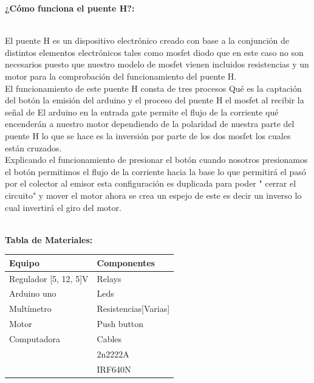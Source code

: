 \documentclass[letterpaper]{article}
\begin{document}
\begin{huge}
\textbf{¿Cómo funciona el puente H?:}\\\\
\end{huge}
El puente H es un dispositivo electrónico creado con base a la conjunción de distintos elementos electrónicos tales como mosfet diodo que en este caso no son necesarios puesto que nuestro modelo de mosfet vienen incluidos resistencias y un motor para la comprobación del funcionamiento del puente H.\\
El funcionamiento de este puente H consta de tres procesos Qué es la captación del botón la emisión del arduino y el proceso del puente H el mosfet al recibir la señal de El arduino en la entrada gate permite el flujo de la corriente qué encenderán a nuestro motor dependiendo de la polaridad de nuestra parte del puente H lo que se hace es la inversión por parte de los dos mosfet los cuales están cruzados.\\
Explicando el funcionamiento de presionar el botón cuando nosotros presionamos el botón permitimos el flujo de la corriente hacia la base lo que permitirá el pasó por el colector al emisor esta configuración es duplicada para poder " cerrar el circuito" y mover el motor ahora se crea un espejo de este es decir un inverso lo cual invertirá el giro del motor.
\\\\
\begin{huge}
\textbf{Tabla de Materiales:}\\
\end{huge}


    \begin{table}[h]
\begin{tabular}{|l|l|}
\hline
{\color[HTML]{3166FF} \textbf{Equipo}} & {\color[HTML]{CB0000} \textbf{Componentes}} \\ \hline
Regulador {[}5, 12, 5{]}V              & Relays                                      \\ \hline
Arduino uno                            & Leds                                        \\ \hline
Multímetro                             & Resistencias{[}Varias{]}                    \\ \hline
Motor                                  & Push button                                 \\ \hline
Computadora                            & Cables                                      \\ \hline
                                       & 2n2222A                                     \\ \hline
                                       & IRF640N                                     \\ \hline
\end{tabular}
\end{table}
\end{document}
